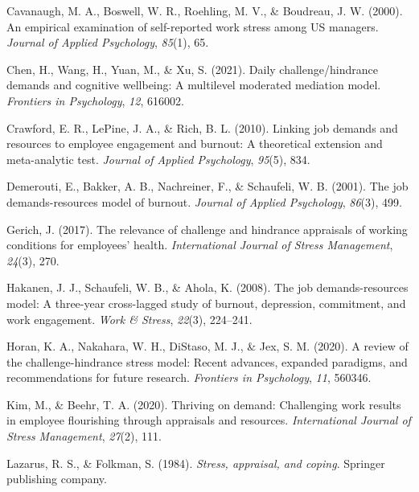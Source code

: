 \documentclass[
  man,mask]{apa7}
\newlength{\cslhangindent}
\newlength{\cslentryspacingunit} %
\newenvironment{CSLReferences}[2] %
 {%
  \setlength{\parindent}{0pt}
  \ifodd #1
  \let\oldpar\par
  \def\par{\hangindent=\cslhangindent\oldpar}
  \fi
  \setlength{\parskip}{#2\cslentryspacingunit}
 }%
 {}
\begin{document}
\begin{CSLReferences}{1}{0}
\leavevmode{}%
Cavanaugh, M. A., Boswell, W. R., Roehling, M. V., \& Boudreau, J. W. (2000). An empirical examination of self-reported work stress among US managers. \emph{Journal of Applied Psychology}, \emph{85}(1), 65.

\leavevmode{}%
Chen, H., Wang, H., Yuan, M., \& Xu, S. (2021). Daily challenge/hindrance demands and cognitive wellbeing: A multilevel moderated mediation model. \emph{Frontiers in Psychology}, \emph{12}, 616002.

\leavevmode{}%
Crawford, E. R., LePine, J. A., \& Rich, B. L. (2010). Linking job demands and resources to employee engagement and burnout: A theoretical extension and meta-analytic test. \emph{Journal of Applied Psychology}, \emph{95}(5), 834.

\leavevmode{}%
Demerouti, E., Bakker, A. B., Nachreiner, F., \& Schaufeli, W. B. (2001). The job demands-resources model of burnout. \emph{Journal of Applied Psychology}, \emph{86}(3), 499.

\leavevmode{}%
Gerich, J. (2017). The relevance of challenge and hindrance appraisals of working conditions for employees' health. \emph{International Journal of Stress Management}, \emph{24}(3), 270.

\leavevmode{}%
Hakanen, J. J., Schaufeli, W. B., \& Ahola, K. (2008). The job demands-resources model: A three-year cross-lagged study of burnout, depression, commitment, and work engagement. \emph{Work \& Stress}, \emph{22}(3), 224--241.

\leavevmode{}%
Horan, K. A., Nakahara, W. H., DiStaso, M. J., \& Jex, S. M. (2020). A review of the challenge-hindrance stress model: Recent advances, expanded paradigms, and recommendations for future research. \emph{Frontiers in Psychology}, \emph{11}, 560346.

\leavevmode{}%
Kim, M., \& Beehr, T. A. (2020). Thriving on demand: Challenging work results in employee flourishing through appraisals and resources. \emph{International Journal of Stress Management}, \emph{27}(2), 111.

\leavevmode{}%
Lazarus, R. S., \& Folkman, S. (1984). \emph{Stress, appraisal, and coping}. Springer publishing company.


\end{CSLReferences}
\end{document}
